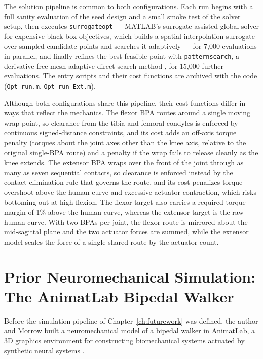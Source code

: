 The solution pipeline is common to both configurations. Each run begins with a full sanity evaluation of the seed design and a small smoke test of the solver setup, then executes \texttt{surrogateopt} --- MATLAB's surrogate-assisted global solver for expensive black-box objectives, which builds a spatial interpolation surrogate over sampled candidate points and searches it adaptively \citep{mathworks_optimization_2025} --- for 7,000 evaluations in parallel, and finally refines the best feasible point with \texttt{patternsearch}, a derivative-free mesh-adaptive direct search method \citep{audet_mads_2006, mathworks_optimization_2025}, for 15,000 further evaluations. The entry scripts and their cost functions are archived with the code (\texttt{Opt\_run.m}, \texttt{Opt\_run\_Ext.m}).

Although both configurations share this pipeline, their cost functions differ in ways that reflect the mechanics. The flexor BPA routes around a single moving wrap point, so clearance from the tibia and femoral condyles is enforced by continuous signed-distance constraints, and its cost adds an off-axis torque penalty (torques about the joint axes other than the knee axis, relative to the original single-BPA route) and a penalty if the wrap fails to release cleanly as the knee extends. The extensor BPA wraps over the front of the joint through as many as seven sequential contacts, so clearance is enforced instead by the contact-elimination rule that governs the route, and its cost penalizes torque overshoot above the human curve and excessive actuator contraction, which risks bottoming out at high flexion. The flexor target also carries a required torque margin of 1\% above the human curve, whereas the extensor target is the raw human curve. With two BPAs per joint, the flexor route is mirrored about the mid-sagittal plane and the two actuator forces are summed, while the extensor model scales the force of a single shared route by the actuator count.

\section{Prior Neuromechanical Simulation: The AnimatLab Bipedal Walker}\label{sec:prior_walker}

Before the simulation pipeline of Chapter~\ref{ch:futurework} was defined, the author and Morrow built a neuromechanical model of a bipedal walker in AnimatLab, a 3D graphics environment for constructing biomechanical systems actuated by synthetic neural systems \citep{cofer_animatlab_2010}. 

